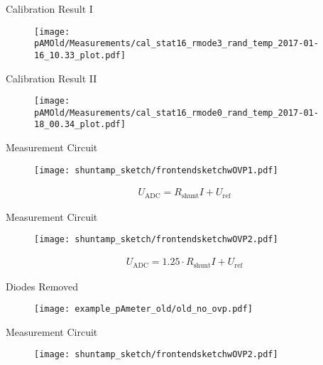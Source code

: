 \documentclass[t]{beamer}
\begin{document}
\begin{frame}[c]{Calibration Result I}
	\begin{figure}
		\texttt{[image: pAMOld/Measurements/cal\_stat16\_rmode3\_rand\_temp\_2017-01-16\_10.33\_plot.pdf]}
	\end{figure}
\end{frame}

\begin{frame}[c]{Calibration Result II}
	\begin{figure}
		\texttt{[image: pAMOld/Measurements/cal\_stat16\_rmode0\_rand\_temp\_2017-01-18\_00.34\_plot.pdf]}
	\end{figure}
\end{frame}

\begin{frame}[c]{Measurement Circuit}
	\begin{figure}
		\texttt{[image: shuntamp\_sketch/frontendsketchwOVP1.pdf]}
	\end{figure}
	\begin{align}
	U_\text{ADC}=R_\text{shunt}I+U_\text{ref}
	\end{align}
\end{frame}

\begin{frame}[c]{Measurement Circuit}
	\begin{figure}
		\texttt{[image: shuntamp\_sketch/frontendsketchwOVP2.pdf]}
	\end{figure}
	\begin{align}
	U_\text{ADC}=1.25\cdot R_\text{shunt}I+U_\text{ref}
	\end{align}
\end{frame}

\begin{frame}[c]{Diodes Removed}
	\begin{figure}
		\texttt{[image: example\_pAmeter\_old/old\_no\_ovp.pdf]}
	\end{figure}
\end{frame}

\begin{frame}[c]{Measurement Circuit}
	\begin{figure}
		\texttt{[image: shuntamp\_sketch/frontendsketchwOVP2.pdf]}
	\end{figure}
\end{frame}
\end{document}
